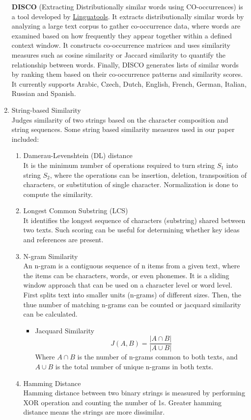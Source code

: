 \documentclass{article}
\begin{document}
\begin{enumerate}
	\textbf{DISCO} (Extracting Distributionally similar words
	using CO-occurrences) is a tool developed by \href{https://www.linguatools.de/disco/disco_en.html}{Linguatools}. It extracts distributionally similar words by analyzing a large text corpus to gather co-occurrence data, where words are examined based on how frequently they appear together within a defined context window. It constructs co-occurrence matrices and uses similarity measures such as cosine similarity or Jaccard similarity to quantify the relationship between words. Finally, DISCO generates lists of similar words by ranking them based on their co-occurrence patterns and similarity scores. It currently supports Arabic, Czech, Dutch, English, French, German, Italian, Russian and Spanish.
	
	\item String-based Similarity \\ Judges similarity of two strings based on the character composition and string sequences. Some string based similarity measures used in our paper included:
	\begin{enumerate}[]
		\item Damerau-Levenshtein (DL) distance \\ It is the minimum number of operations required to turn string $S_1$ into string $S_2$, where the operations can be insertion, deletion, transposition of characters, or substitution of single character. Normalization \cite{1_gomaa2014arabic} is done to compute the similarity.
		\item Longest Common Substring (LCS) \\ It identifies the longest sequence of characters (substring) shared between two texts. Such scoring can be useful for determining whether key ideas and references are present.
		\item N-gram Similarity \\ An n-gram is a contiguous sequence of n items from a given text, where the items can be characters, words, or even phonemes. It is a sliding window approach that can be used on a character level or word level. First splits text into smaller units (n-grams) of different sizes. Then, the thue number of matching n-grams can be counted or jacquard similarity can be calculated.
		\begin{itemize}
			\item Jacquard Similarity \\ $$J(A,B) = \frac{|A \cap B|}{|A \cup B|}$$ Where $A \cap B$ is the number of n-grams common to both texts, and $A \cup B$ is the total number of unique n-grams in both texts.
		\end{itemize}
		\item Hamming Distance \\ Hamming distance between two binary strings is measured by performing XOR operation and counting the number of 1s. Greater hamming distance means the strings are more dissimilar. 
	\end{enumerate}
\end{enumerate}
\end{document}

